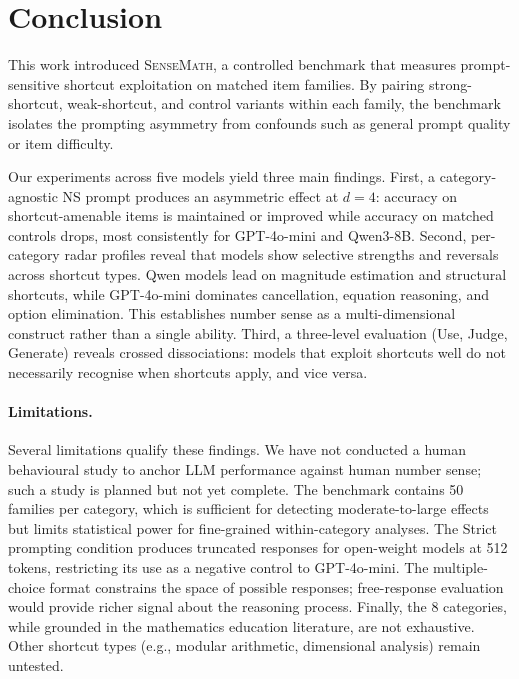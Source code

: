 \section{Conclusion}
\label{sec:conclusion}

This work introduced \textsc{SenseMath}, a controlled benchmark that measures prompt-sensitive shortcut exploitation on matched item families.
By pairing strong-shortcut, weak-shortcut, and control variants within each family, the benchmark isolates the prompting asymmetry from confounds such as general prompt quality or item difficulty.

Our experiments across five models yield three main findings.
First, a category-agnostic NS prompt produces an asymmetric effect at $d{=}4$: accuracy on shortcut-amenable items is maintained or improved while accuracy on matched controls drops, most consistently for GPT-4o-mini and Qwen3-8B.
Second, per-category radar profiles reveal that models show selective strengths and reversals across shortcut types. Qwen models lead on magnitude estimation and structural shortcuts, while GPT-4o-mini dominates cancellation, equation reasoning, and option elimination. This establishes number sense as a multi-dimensional construct rather than a single ability.
Third, a three-level evaluation (Use, Judge, Generate) reveals crossed dissociations: models that exploit shortcuts well do not necessarily recognise when shortcuts apply, and vice versa.

\paragraph{Limitations.}
Several limitations qualify these findings.
We have not conducted a human behavioural study to anchor LLM performance against human number sense; such a study is planned but not yet complete.
The benchmark contains 50 families per category, which is sufficient for detecting moderate-to-large effects but limits statistical power for fine-grained within-category analyses.
The Strict prompting condition produces truncated responses for open-weight models at 512 tokens, restricting its use as a negative control to GPT-4o-mini.
The multiple-choice format constrains the space of possible responses; free-response evaluation would provide richer signal about the reasoning process.
Finally, the 8 categories, while grounded in the mathematics education literature, are not exhaustive. Other shortcut types (e.g., modular arithmetic, dimensional analysis) remain untested.

